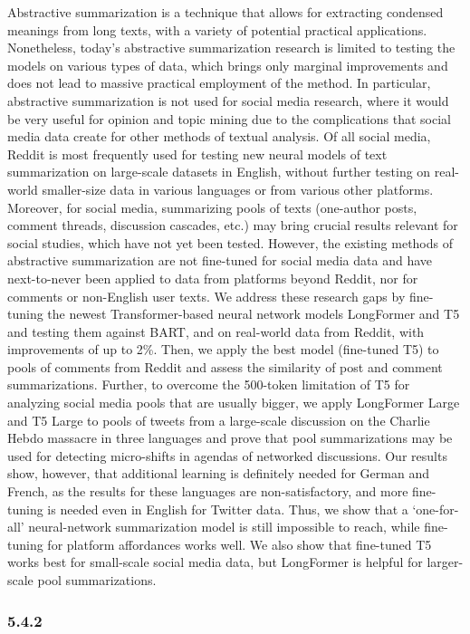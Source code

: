 Abstractive summarization is a technique that allows for extracting condensed meanings from long texts, with a variety of potential practical applications. Nonetheless, today’s abstractive summarization research is limited to testing the models on various types of data, which brings only marginal improvements and does not lead to massive practical employment of the method. In particular, abstractive summarization is not used for social media research, where it would be very useful for opinion and topic mining due to the complications that social media data create for other methods of textual analysis. Of all social media, Reddit is most frequently used for testing new neural models of text summarization on large-scale datasets in English, without further testing on real-world smaller-size data in various languages or from various other platforms. Moreover, for social media, summarizing pools of texts (one-author posts, comment threads, discussion cascades, etc.) may bring crucial results relevant for social studies, which have not yet been tested. However, the existing methods of abstractive summarization are not fine-tuned for social media data and have next-to-never been applied to data from platforms beyond Reddit, nor for comments or non-English user texts. We address these research gaps by fine-tuning the newest Transformer-based neural network models LongFormer and T5 and testing them against BART, and on real-world data from Reddit, with improvements of up to 2\%. Then, we apply the best model (fine-tuned T5) to pools of comments from Reddit and assess the similarity of post and comment summarizations. Further, to overcome the 500-token limitation of T5 for analyzing social media pools that are usually bigger, we apply LongFormer Large and T5 Large to pools of tweets from a large-scale discussion on the Charlie Hebdo massacre in three languages and prove that pool summarizations may be used for detecting micro-shifts in agendas of networked discussions. Our results show, however, that additional learning is definitely needed for German and French, as the results for these languages are non-satisfactory, and more fine-tuning is needed even in English for Twitter data. Thus, we show that a ‘one-for-all’ neural-network summarization model is still impossible to reach, while fine-tuning for platform affordances works well. We also show that fine-tuned T5 works best for small-scale social media data, but LongFormer is helpful for larger-scale pool summarizations.

\subsubsection{5.4.2}

